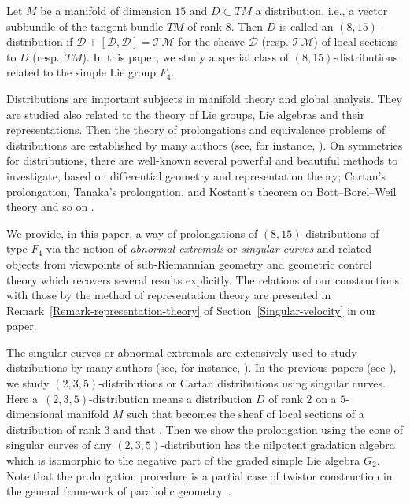 \documentclass[pdftex]{sigma}
\numberwithin{equation}{section}
\theoremstyle{definition}
\newcommand{\0}{\boldsymbol{0}}
\begin{document}
Let $M$ be a manifold of dimension $15$ and $D \subset TM$ a distribution, i.e., a vector subbundle of
the tangent bundle $TM$ of rank $8$.
Then $D$ is called an $(8, 15)$-distribution
if ${\mathcal D} + [{\mathcal D}, {\mathcal D}] = {\mathcal{TM}}$ for the sheave ${\mathcal D}$ (resp.
${\mathcal{TM}}$) of local sections to $D$ (resp.\ $TM$).
In this paper, we study a special class of $(8, 15)$-distributions related to the simple Lie group $F_4$.

Distributions are important subjects in manifold theory and global analysis. They are studied
also related to the theory of Lie groups, Lie algebras and their representations.
Then the theory of prolongations and equivalence problems of distributions are established by many authors (see, for instance,
\cite{BCGGG,Montgomery, Morimoto, Tanaka1}).
On symmetries for distributions, there are well-known several
powerful and beautiful methods to investigate, based on differential geometry and representation theory;
Cartan's prolongation, Tanaka's prolongation, and Kostant's theorem on Bott--Borel--Weil theory
and so on \cite{Cartan1,Helgason, Hwang, LM, Kostant, Tanaka1, Tanaka2, Yamaguchi}.

We provide, in this paper, a way of prolongations of $(8, 15)$-distributions of type $F_4$
via the notion of {\it abnormal extremals} or {\it singular curves} and related objects from viewpoints of
sub-Riemannian geometry and geometric control theory \cite{AS, LS, Montgomery0, Montgomery}
which recovers several results explicitly. The relations of our constructions with those by the method of representation theory are presented in Remark~\ref{Remark-representation-theory} of Section~\ref{Singular-velocity} in our paper.

The singular curves or abnormal extremals are extensively used to study distributions by many authors (see, for instance,
\cite{AZ, BH, DZ1, DZ2}).
In the previous papers (see \cite{IKTY, IKY1,IMT}), we study $(2, 3, 5)$-distributions or
Cartan distributions \cite{Bryant, Cartan1} using singular curves.
Here a~$(2, 3, 5)$-distribution means a distribution $D$ of rank $2$ on a $5$-dimensional manifold $M$
such that 
becomes the sheaf of local sections of a distribution  of rank $3$ and that
.
Then we show the prolongation using the cone of singular curves of any $(2, 3, 5)$-distribution has
the nilpotent gradation algebra which is isomorphic to the negative part of the graded simple Lie algebra $G_2$.
Note that the prolongation procedure is a partial case of twistor construction in the general framework of
parabolic geometry~\cite{BE, CS}.
\end{document}
